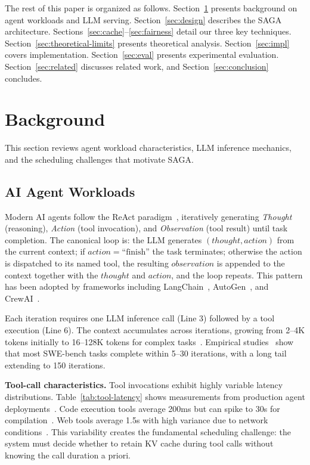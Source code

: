 \documentclass[sigconf]{acmart}
\newcommand{\sysname}{SAGA\xspace}
\begin{document}
The rest of this paper is organized as follows. Section~\ref{sec:background} presents background on agent workloads and LLM serving. Section~\ref{sec:design} describes the \sysname architecture. Sections~\ref{sec:cache}--\ref{sec:fairness} detail our three key techniques. Section~\ref{sec:theoretical-limits} presents theoretical analysis. Section~\ref{sec:impl} covers implementation. Section~\ref{sec:eval} presents experimental evaluation. Section~\ref{sec:related} discusses related work, and Section~\ref{sec:conclusion} concludes.

\section{Background}
\label{sec:background}

This section reviews agent workload characteristics, LLM inference mechanics, and the scheduling challenges that motivate \sysname.

\subsection{AI Agent Workloads}
\label{sec:bg-agents}

Modern AI agents follow the ReAct paradigm~\cite{yao2023react}, iteratively generating \emph{Thought} (reasoning), \emph{Action} (tool invocation), and \emph{Observation} (tool result) until task completion. The canonical loop is: the LLM generates $(thought, action)$ from the current context; if $action = \text{``finish''}$ the task terminates; otherwise the action is dispatched to its named tool, the resulting $observation$ is appended to the context together with the $thought$ and $action$, and the loop repeats. This pattern has been adopted by frameworks including LangChain~\cite{langchain2024}, AutoGen~\cite{wu2024autogen}, and CrewAI~\cite{crewai2023}.

Each iteration requires one LLM inference call (Line 3) followed by a tool execution (Line 6). The context accumulates across iterations, growing from 2--4K tokens initially to 16--128K tokens for complex tasks~\cite{liu2024agentlimits}. Empirical studies~\cite{kapoor2024ai,ruan2024identifying} show that most SWE-bench tasks complete within 5--30 iterations, with a long tail extending to 150 iterations.

\textbf{Tool-call characteristics.} Tool invocations exhibit highly variable latency distributions. Table~\ref{tab:tool-latency} shows measurements from production agent deployments~\cite{wang2024burstgpt,stojkovic2024dynamollm}. Code execution tools average 200ms but can spike to 30s for compilation~\cite{jimenez2024swebench}. Web tools average 1.5s with high variance due to network conditions~\cite{zhou2024webarena}. This variability creates the fundamental scheduling challenge: the system must decide whether to retain KV cache during tool calls without knowing the call duration a priori.
\end{document}
